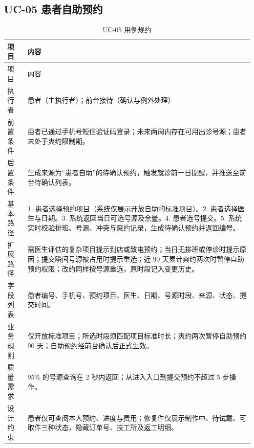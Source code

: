 \documentclass[UTF8,a4paper,12pt,fontset=fandol]{ctexart}
\begin{document}
\subsection{UC-05 患者自助预约}
\begin{longtable}{L{3.1cm}Z}
\caption{UC-05 用例规约}\label{tab:uc05}\\
\toprule 项目 & 内容 \\ \midrule
\endfirsthead
\toprule 项目 & 内容 \\ \midrule
\endhead
执行者 & 患者（主执行者）；前台接待（确认与例外处理） \\
前置条件 & 患者已通过手机号短信验证码登录；未来两周内存在可用出诊号源；患者未处于爽约限制期。 \\
后置条件 & 生成来源为“患者自助”的待确认预约，触发就诊前一日提醒，并推送至前台待确认列表。 \\
基本路径 & 1. 患者选择预约项目（系统仅展示开放自助的标准项目）。2. 患者选择医生与日期。3. 系统返回当日可选号源及余量。4. 患者选号提交。5. 系统实时校验排班、号源、冲突与爽约记录，生成待确认预约并返回编号。 \\
扩展路径 & 需医生评估的复杂项目提示到店或致电预约；当日无排班或停诊时提示原因；提交瞬间号源被占用时提示重选；近 90 天累计爽约两次时暂停自助预约权限；改约同样按号源重选，原时段记入变更历史。 \\
字段列表 & 患者编号、手机号、预约项目、医生、日期、号源时段、来源、状态、提交时间。 \\
业务规则 & 仅开放标准项目；所选时段须匹配项目标准时长；爽约两次暂停自助预约 90 天；自助预约经前台确认后正式生效。 \\
质量需求 & 95\% 的号源查询在 2 秒内返回；从进入入口到提交预约不超过 5 步操作。 \\
设计约束 & 患者仅可查阅本人预约、进度与费用；修复件仅展示制作中、待试戴、可取件三种状态，隐藏订单号、技工所及返工明细。 \\
\bottomrule
\end{longtable}

\end{document}
